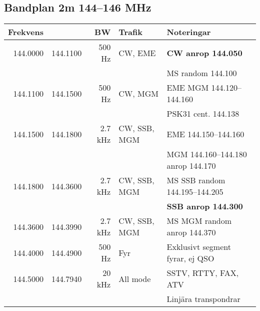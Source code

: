 \begin{landscape}
\subsection{Bandplan 2m 144--146 MHz}
\begin{tabular}{rrrll}
	\textbf{Frekvens}         &               & \textbf{BW}   & \textbf{Trafik}     & \textbf{Noteringar}                                          \\ \hline
	         144.0000         & 144.1100      & 500 Hz        & CW, EME             & \textbf{CW anrop 144.050}                                    \\
                                  &               &               &                     & MS random 144.100                                            \\ \hline
	         144.1100         & 144.1500      & 500 Hz        & CW, MGM             & EME MGM 144.120--144.160                                     \\
                                  &               &               &                     & PSK31 cent. 144.138                                          \\ \hline
	         144.1500         & 144.1800      & 2.7 kHz       & CW, SSB, MGM        & EME 144.150--144.160                                         \\
                                  &               &               &                     & MGM 144.160--144.180 anrop 144.170                           \\ \hline
	         144.1800         & 144.3600      & 2.7 kHz       & CW, SSB, MGM        & MS SSB random 144.195--144.205                               \\
                                  &               &               &                     & \textbf{SSB anrop 144.300}                                   \\ \hline
	         144.3600         & 144.3990      & 2.7 kHz       & CW, SSB, MGM        & MS MGM random anrop 144.370                                  \\ \hline
	         144.4000         & 144.4900      & 500 Hz        & Fyr                 & Exklusivt segment fyrar, ej QSO                              \\ \hline
	         144.5000         & 144.7940      & 20 kHz        & All mode            & SSTV, RTTY, FAX, ATV                                         \\
                                  &               &               &                     & Linjära transpondrar                                         \\ \hline

\end{tabular}
\end{landscape}
